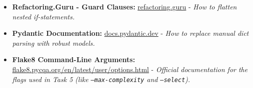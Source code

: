 \documentclass[a4paper,12pt]{article}
\begin{document}
\begin{itemize}
    \item \textbf{Refactoring.Guru - Guard Clauses:} \href{https://refactoring.guru/replace-nested-conditional-with-guard-clauses}{refactoring.guru} - \textit{How to flatten nested if-statements.}
    \item \textbf{Pydantic Documentation:} \href{https://docs.pydantic.dev/latest/}{docs.pydantic.dev} - \textit{How to replace manual dict parsing with robust models.}
    \item \textbf{Flake8 Command-Line Arguments:} \href{https://flake8.pycqa.org/en/latest/user/options.html}{flake8.pycqa.org/en/latest/user/options.html} - \textit{Official documentation for the flags used in Task 5 (like \texttt{--max-complexity} and \texttt{--select}).}
\end{itemize}
\end{document}
